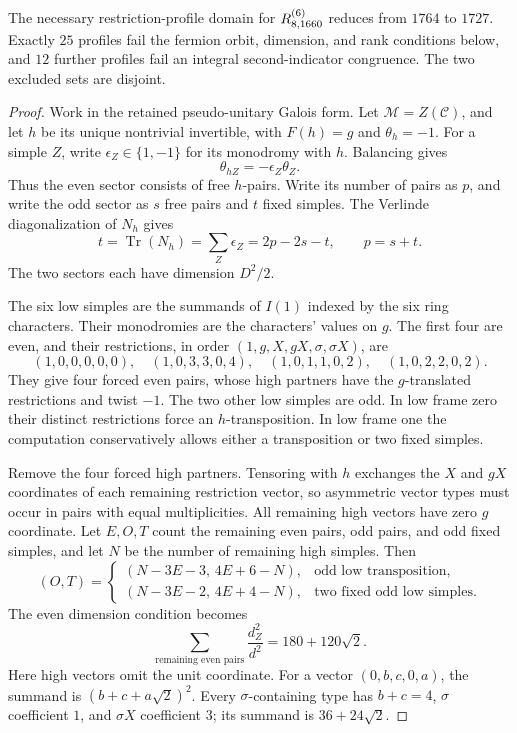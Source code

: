 \begin{proposition}\label{prop:1660-fermion-profiles}
The necessary restriction-profile domain for $R^{(6)}_{8,1660}$ reduces from
$1764$ to $1727$. Exactly $25$ profiles fail the fermion orbit, dimension,
and rank conditions below, and $12$ further profiles fail an integral
second-indicator congruence. The two excluded sets are disjoint.
\end{proposition}
\begin{proof}
Work in the retained pseudo-unitary Galois form.
Let $\mathcal M=Z(\mathcal C)$, and let $h$ be its unique nontrivial
invertible, with $F(h)=g$ and $\theta_h=-1$.
For a simple $Z$, write $\epsilon_Z\in\{1,-1\}$ for its monodromy with
$h$. Balancing gives
\[
 \theta_{hZ}=-\epsilon_Z\theta_Z.
\]
Thus the even sector consists of free $h$-pairs. Write its number of
pairs as $p$, and write the odd sector as $s$ free pairs and $t$ fixed
simples. The Verlinde diagonalization of $N_h$ gives
\[
 t=\operatorname{Tr}(N_h)=\sum_Z\epsilon_Z=2p-2s-t,
 \qquad p=s+t.
\]
The two sectors each have dimension $D^2/2$.

The six low simples are the summands of $I(1)$ indexed by the six ring
characters. Their monodromies are the characters' values on $g$.
The first four are even, and their restrictions, in order
$(1,g,X,gX,\sigma,\sigma X)$, are
\[
 (1,0,0,0,0,0),\quad(1,0,3,3,0,4),\quad
 (1,0,1,1,0,2),\quad(1,0,2,2,0,2).
\]
They give four forced even pairs, whose high partners have the
$g$-translated restrictions and twist $-1$. The two other low simples
are odd. In low frame zero their distinct restrictions force an
$h$-transposition. In low frame one the computation conservatively
allows either a transposition or two fixed simples.

Remove the four forced high partners. Tensoring with $h$ exchanges the
$X$ and $gX$ coordinates of each remaining restriction vector, so
asymmetric vector types must occur in pairs with equal multiplicities.
All remaining high vectors have zero $g$ coordinate.
Let $E,O,T$ count the remaining even pairs, odd pairs, and odd fixed
simples, and let $N$ be the number of remaining high simples. Then
\[
 (O,T)=
 \begin{cases}
 (N-3E-3,\,4E+6-N),&\text{odd low transposition},\\
 (N-3E-2,\,4E+4-N),&\text{two fixed odd low simples}.
 \end{cases}
\]
The even dimension condition becomes
\[
 \sum_{\text{remaining even pairs}}\frac{d_Z^2}{d^2}
       =180+120\sqrt2.
\]
Here high vectors omit the unit coordinate. For a vector $(0,b,c,0,a)$, the summand is
$(b+c+a\sqrt2)^2$. Every $\sigma$-containing type has
$b+c=4$, $\sigma$ coefficient $1$, and $\sigma X$ coefficient $3$;
its summand is $36+24\sqrt2$.


\end{proof}
